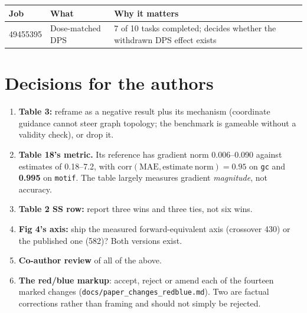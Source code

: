 \documentclass[10pt]{article}
\begin{document}
\begin{center}
\begin{tabular}{@{}llp{8.2cm}@{}}
\toprule
\textbf{Job} & \textbf{What} & \textbf{Why it matters} \\
\midrule
49455395 & Dose-matched DPS & 7 of 10 tasks completed; decides whether the withdrawn DPS effect exists \\
\bottomrule
\end{tabular}
\end{center}

\section{Decisions for the authors}

\begin{enumerate}\itemsep2pt
\item \textbf{Table 3:} reframe as a negative result plus its mechanism (coordinate guidance cannot
      steer graph topology; the benchmark is gameable without a validity check), or drop it.
\item \textbf{Table 18's metric.} Its reference has gradient norm 0.006--0.090 against estimates of
      0.18--7.2, with $\mathrm{corr(MAE, estimate\ norm)}=0.95$ on \texttt{gc} and \textbf{0.995} on
      \texttt{motif}. The table largely measures gradient \emph{magnitude}, not accuracy.
\item \textbf{Table 2 SS row:} report three wins and three ties, not six wins.
\item \textbf{Fig 4's axis:} ship the measured forward-equivalent axis (crossover 430) or the
      published one (582)? Both versions exist.
\item \textbf{Co-author review} of all of the above.
\item \textbf{The red/blue markup}: accept, reject or amend each of the fourteen marked changes
      (\texttt{docs/paper\_changes\_redblue.md}). Two are factual corrections rather than framing
      and should not simply be rejected.
\end{enumerate}
\end{document}
